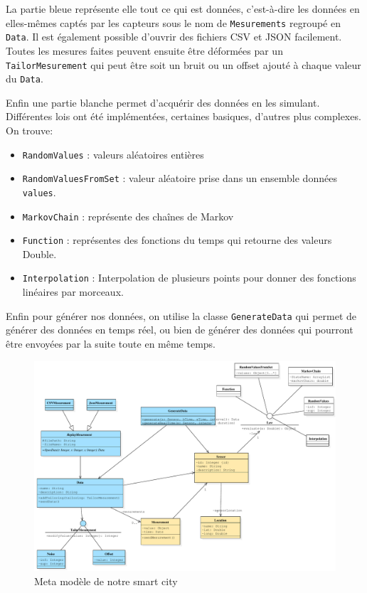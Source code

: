 \documentclass[11pt]{article}
\begin{document}
La partie bleue représente elle tout ce qui est données, c'est-à-dire les données en elles-mêmes captés par les capteurs sous le nom de \texttt{Mesurements} regroupé en \texttt{Data}. Il est également possible d'ouvrir des fichiers CSV et JSON facilement. 
Toutes les mesures faites peuvent ensuite être déformées par un \texttt{TailorMesurement} qui peut être soit un bruit ou un offset ajouté à chaque valeur du \texttt{Data}.

Enfin une partie blanche permet d'acquérir des données en les simulant. Différentes lois ont été implémentées, certaines basiques, d'autres plus complexes. On trouve:
\begin{itemize}
\item \texttt{RandomValues} : valeurs aléatoires entières
\item \texttt{RandomValuesFromSet} : valeur aléatoire prise dans un ensemble données \texttt{values}.
\item \texttt{MarkovChain} : représente des chaînes de Markov
\item \texttt{Function} : représentes des fonctions du temps qui retourne des valeurs Double.
\item \texttt{Interpolation} : Interpolation de plusieurs points pour donner des fonctions linéaires par morceaux.
\end{itemize}



Enfin pour générer nos données, on utilise la classe \texttt{GenerateData} qui permet de générer des données en temps réel, ou bien de générer des données qui pourront être envoyées par la suite toute en même temps.


\begin{figure}
\includegraphics[width=\textwidth]{Figs/Main.pdf}
\caption{Meta modèle de notre smart city}
\end{figure}
\end{document}
